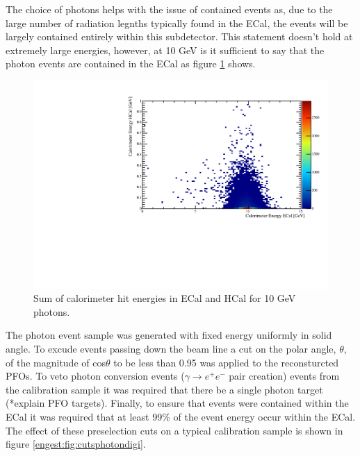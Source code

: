 
The choice of photons helps with the issue of contained events as, due to the large number of radiation legnths typically found in the ECal, the events will be largely contained entirely within this subdetector.  This statement doesn't hold at extremely large energies, however, at 10 GeV is it sufficient to say that the photon events are contained in the ECal as figure \ref{engest:fig:energysplitphotondigi} shows.

\begin{figure}
  \includegraphics[width=\largefigwidth]{EnergyEstimators/Plots/Calibration/Digitsation/ECal/10GeVPhotonEnergyECalHCal.pdf}
  \caption[Sum of calorimeter hit energies in ECal and HCal for 10 GeV photons.]{Sum of calorimeter hit energies in ECal and HCal for 10 GeV photons.}
  \label{engest:fig:energysplitphotondigi}
\end{figure}

The photon event sample was generated with fixed energy uniformly in solid angle.  To excude events passing down the beam line a cut on the polar angle, $\theta$, of the magnitude of cos$\theta$ to be less than 0.95 was applied to the reconsturcted PFOs.  To veto photon conversion events ($\gamma \rightarrow e^{+}e^{-}$ pair creation) events from the calibration sample it was required that there be a single photon target (*explain PFO targets).  Finally, to ensure that events were contained within the ECal it was required that at least 99\% of the event energy occur within the ECal.  The effect of these preselection cuts on a typical calibration sample is shown in figure \ref{engest:fig:cutsphotondigi}.  


